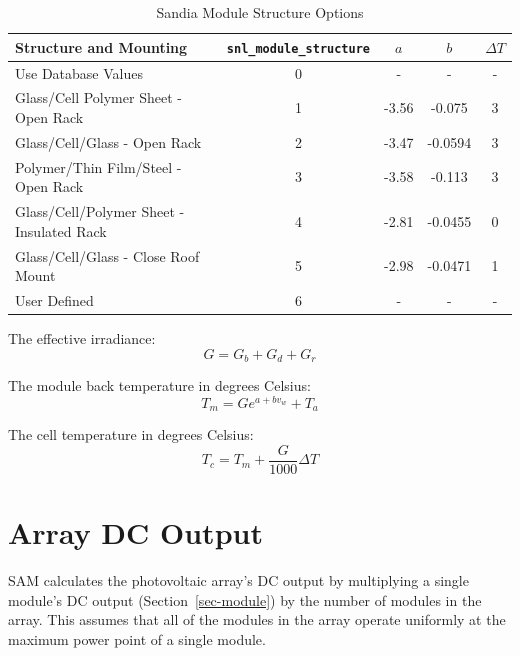 \documentclass[12pt,letterpaper]{article}
\begin{document}
\begin{table}
\begin{center}
\caption{Sandia Module Structure Options}
\begin{tabular}{lcccc}
\midrule
Structure and Mounting & \texttt{snl\_module\_structure} & $a$ & $b$ & $\Delta T$ \\
\midrule
Use Database Values & 0 & - & - & - \\
Glass/Cell Polymer Sheet - Open Rack & 1 & -3.56 & -0.075 & 3 \\
Glass/Cell/Glass - Open Rack & 2 & -3.47 & -0.0594 & 3 \\
Polymer/Thin Film/Steel - Open Rack & 3 & -3.58 & -0.113 & 3 \\
Glass/Cell/Polymer Sheet - Insulated Rack & 4 & -2.81 & -0.0455 & 0 \\
Glass/Cell/Glass - Close Roof Mount & 5 & -2.98 & -0.0471 & 1 \\
User Defined & 6 & - & - & - \\
\hline
\end{tabular}
\label{tab-sandiamodstruct}
\end{center}
\end{table}

The effective irradiance:
\begin{equation}
G = G_b + G_d + G_r
\end{equation}

The module back temperature in degrees Celsius:
\begin{equation}
T_m = G e^{a+b v_w} + T_a
\end{equation}

The cell temperature in degrees Celsius:
\begin{equation}\label{eqn-cectemp}
T_c = T_m + \frac{G}{1000}  \Delta T
\end{equation}

\chapter{Array DC Output}\label{sec-arraydcoutput}

SAM calculates the photovoltaic array's DC output by multiplying a single module's DC output (Section~\ref{sec-module}) by the number of modules in the array. This assumes that all of the modules in the array operate uniformly at the maximum power point of a single module. 
\end{document}
